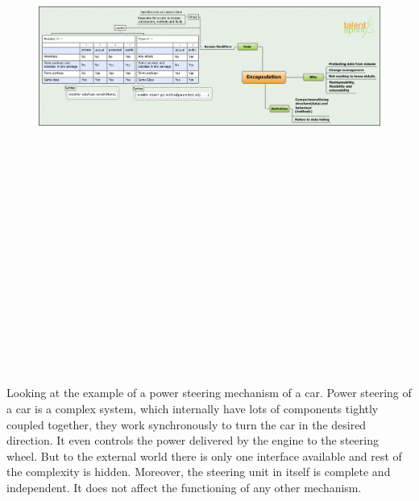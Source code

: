 \documentclass[11pt,a4paper]{article}
\begin{document}
\begin{itemize}
\begin{figure}[H]
\begin{center}
\includegraphics[angle=90,height=20cm, width=13cm]{EncapsulationMM.png}
\end{center}
\end{figure}

\end{itemize}
Looking at the example of a power steering mechanism of a car. Power steering of a car is a complex system, which internally have lots of components tightly coupled together, they work synchronously to turn the car in the desired direction. It even controls the power delivered by the engine to the steering wheel. But to the external world there is only one interface available and rest of the complexity is hidden. Moreover, the steering unit in itself is complete and independent. It does not affect the functioning of any other mechanism.
\end{document}

